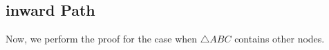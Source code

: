 \subsection{inward Path}
Now, we perform the proof for the case when $\triangle{ABC} $ contains other nodes.
